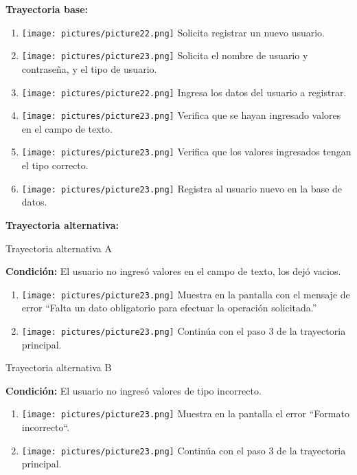 \textbf{Trayectoria base:}    
\begin{enumerate}
\item \texttt{[image: pictures/picture22.png]} Solicita registrar un nuevo usuario.
\item \texttt{[image: pictures/picture23.png]} Solicita el nombre de usuario y contraseña, y el tipo de usuario.
\item \texttt{[image: pictures/picture22.png]} Ingresa los datos del usuario a registrar.
\item \texttt{[image: pictures/picture23.png]} Verifica que se hayan ingresado valores en el campo de texto.
\item \texttt{[image: pictures/picture23.png]} Verifica que los valores ingresados tengan el tipo correcto.
\item \texttt{[image: pictures/picture23.png]} Registra al usuario nuevo en la base de datos.
\end{enumerate}
\textbf{Trayectoria alternativa:}  \\
\vspace{1em}
{\large Trayectoria alternativa A \par}
\textbf{Condición:} El usuario no ingresó valores en el campo de texto, los dejó vacios.
\begin{enumerate}
\item \texttt{[image: pictures/picture23.png]} Muestra en la pantalla con el mensaje de error ``Falta un dato obligatorio para efectuar la operación solicitada.''
\item \texttt{[image: pictures/picture23.png]} Continúa con el paso 3 de la trayectoria principal.
\end{enumerate}
{\large Trayectoria alternativa B \par}
\vspace{0.3em}
\textbf{Condición:} El usuario no ingresó valores de tipo incorrecto.
\begin{enumerate}
\item \texttt{[image: pictures/picture23.png]} Muestra en la pantalla el error ``Formato incorrecto``.
\item \texttt{[image: pictures/picture23.png]} Continúa con el paso 3 de la trayectoria principal.
\end{enumerate}

